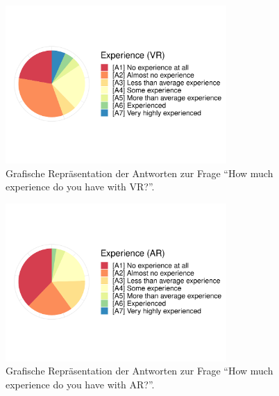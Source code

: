 \begin{figure}
	\centering
	\includegraphics[width=0.75\textwidth]{./appendices/expVr}
	\caption{Grafische Repräsentation der Antworten zur Frage "`How much experience do you have with VR?"'.}
	\label{fig:expVr}
\end{figure}%
\begin{figure}
	\centering
	\includegraphics[width=0.75\textwidth]{./appendices/expAr}
	\caption{Grafische Repräsentation der Antworten zur Frage "`How much experience do you have with AR?"'.}
	\label{fig:expAr}
\end{figure}


